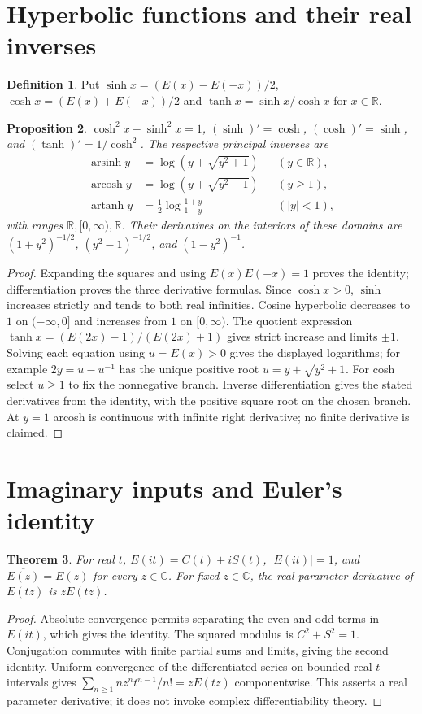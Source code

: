 \documentclass[11pt,oneside,a4paper]{book}
\newtheorem{theorem}{Theorem}[chapter]
\newtheorem{proposition}[theorem]{Proposition}
\theoremstyle{definition}
\newtheorem{definition}[theorem]{Definition}
\theoremstyle{remark}
\newcommand{\R}{\mathbb R}
\newcommand{\C}{\mathbb C}
\newcommand{\KEntry}[2]{\Needspace{7\baselineskip}\section{#2}\label{#1}{\small\sffamily\color{black!60}\detokenize{#1}}\par}
\begin{document}
\KEntry{K03.07.hyperbolic}{Hyperbolic functions and their real inverses}
\begin{definition}
Put $\sinh x=(E(x)-E(-x))/2$, $\cosh x=(E(x)+E(-x))/2$ and
$\tanh x=\sinh x/\cosh x$ for $x\in\R$.
\end{definition}
\begin{proposition}
$\cosh^2x-\sinh^2x=1$, $(\sinh)'=\cosh$, $(\cosh)'=\sinh$,
and $(\tanh)'=1/\cosh^2$. The respective principal inverses are
\begin{align*}
\operatorname{arsinh}y&=\log(y+\sqrt{y^2+1})&& (y\in\R),\\
\operatorname{arcosh}y&=\log(y+\sqrt{y^2-1})&& (y\ge1),\\
\operatorname{artanh}y&=\tfrac12\log\frac{1+y}{1-y}&& (|y|<1),
\end{align*}
with ranges $\R,[0,\infty),\R$. Their derivatives on the interiors
of these domains are $(1+y^2)^{-1/2}$, $(y^2-1)^{-1/2}$,
and $(1-y^2)^{-1}$.
\end{proposition}
\begin{proof}
Expanding the squares and using $E(x)E(-x)=1$ proves the identity;
differentiation proves the three derivative formulas. Since $\cosh x>0$,
$\sinh$ increases strictly and tends to both real infinities. Cosine
hyperbolic decreases to $1$ on $(-\infty,0]$ and increases from $1$ on
$[0,\infty)$. The quotient expression
$\tanh x=(E(2x)-1)/(E(2x)+1)$ gives strict increase and limits $\pm1$.
Solving each equation using $u=E(x)>0$ gives the displayed logarithms;
for example $2y=u-u^{-1}$ has the unique positive root
$u=y+\sqrt{y^2+1}$. For cosh select $u\ge1$ to fix the nonnegative branch.
Inverse differentiation gives the stated derivatives from the identity,
with the positive square root on the chosen branch. At $y=1$ arcosh
is continuous with infinite right derivative; no finite derivative is claimed.
\end{proof}

\KEntry{K03.07.euler}{Imaginary inputs and Euler's identity}
\begin{theorem}
For real $t$, $E(it)=C(t)+iS(t)$, $|E(it)|=1$, and
$\overline{E(z)}=E(\bar z)$ for every $z\in\C$. For fixed $z\in\C$,
the real-parameter derivative of $E(tz)$ is $zE(tz)$.
\end{theorem}
\begin{proof}
Absolute convergence permits separating the even and odd terms in $E(it)$,
which gives the identity. The squared modulus is $C^2+S^2=1$.
Conjugation commutes with finite partial sums and limits, giving the second
identity. Uniform convergence of the differentiated series on bounded real
$t$-intervals gives
$\sum_{n\ge1}nz^nt^{n-1}/n!=zE(tz)$ componentwise. This asserts a real
parameter derivative; it does not invoke complex differentiability theory.
\end{proof}
\end{document}
